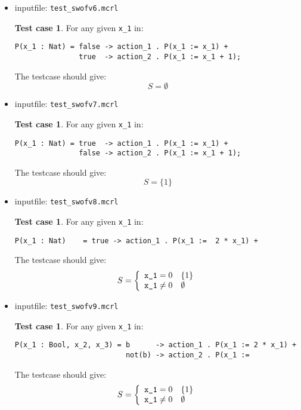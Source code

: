 \documentclass[a4paper,10pt]{article}
\theoremstyle{plain}
\theoremstyle{definition}
\newtheorem{tcase}[thmfs]{Test case}
\begin{document}
\begin{itemize}
\item inputfile: \verb"test_swofv6.mcrl" 
\begin{tcase}
For any given \verb"x_1" in:
\begin{verbatim}
P(x_1 : Nat) = false -> action_1 . P(x_1 := x_1) +
               true  -> action_2 . P(x_1 := x_1 + 1);
\end{verbatim}
The testcase should give:
$$ S = \emptyset $$
\end{tcase}

\item inputfile: \verb"test_swofv7.mcrl" 
\begin{tcase}
For any given \verb"x_1" in:
\begin{verbatim}
P(x_1 : Nat) = true  -> action_1 . P(x_1 := x_1) +
               false -> action_2 . P(x_1 := x_1 + 1);
\end{verbatim}
The testcase should give:
$$ S = \lbrace 1 \rbrace $$
\end{tcase}

\item inputfile: \verb"test_swofv8.mcrl" 
\begin{tcase}
For any given \verb"x_1" in:
\begin{verbatim}
P(x_1 : Nat)	= true -> action_1 . P(x_1 :=  2 * x_1) +
\end{verbatim}
The testcase should give:
\begin{displaymath}
    S = \left\{
        \begin{array}{l l}
            \verb"x_1" = 0                      & \lbrace 1 \rbrace \\
            \verb"x_1" \neq 0                   & \emptyset \\
        \end{array} \right.
\end{displaymath}
\end{tcase}

\item inputfile: \verb"test_swofv9.mcrl" 
\begin{tcase}
For any given \verb"x_1" in:
\begin{verbatim}
P(x_1 : Bool, x_2, x_3) = b      -> action_1 . P(x_1 := 2 * x_1) +
                          not(b) -> action_2 . P(x_1 :=  
\end{verbatim}
The testcase should give:
\begin{displaymath}
    S = \left\{
        \begin{array}{l l}
            \verb"x_1" = 0                      & \lbrace 1 \rbrace \\
            \verb"x_1" \neq 0                   & \emptyset \\
        \end{array} \right.
\end{displaymath}
\end{tcase}

\end{itemize}
\end{document}
